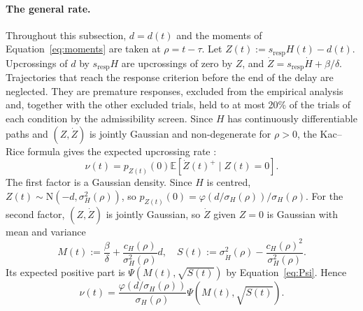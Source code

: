 \documentclass[a4paper,11pt]{article}
\theoremstyle{definition}
\newcommand{\E}{\mathbb E}
\newcommand{\1}{\mathbbm{1}}
\begin{document}
\paragraph{The general rate.} Throughout this subsection, $d=d(t)$ and the moments of Equation~\eqref{eq:moments} are taken at $\rho=t-\tau$. Let $Z\left(t\right):={s}_{\mathrm{resp}}H\left(t\right)-d\left(t\right)$. Upcrossings of $d$ by ${s}_{\mathrm{resp}}H$ are upcrossings of zero by $Z$, and $\dot{Z}={s}_{\mathrm{resp}}\dot{H}+\beta /\delta$. Trajectories that reach the response criterion before the end of the delay are neglected. They are premature responses, excluded from the empirical analysis and, together with the other excluded trials, held to at most 20\% of the trials of each condition by the admissibility screen. Since $H$ has continuously differentiable paths and $\left(Z,\dot{Z}\right)$ is jointly Gaussian and non-degenerate for $\rho >0$, the Kac--Rice formula gives the expected upcrossing rate \parencite[ch. 3]{azaisLevelSetsExtrema2009}:
\begin{equation}
\nu \left(t\right)={p}_{Z\left(t\right)}\left(0\right) \E\left[\dot{Z}\left(t\right)^{+} \mid Z\left(t\right)=0\right].
\label{eq:nu}
\end{equation}
The first factor is a Gaussian density. Since $H$ is centred, $Z\left(t\right)\sim \mathrm{N}\left(-d,{\sigma }_{H}^{2}\left(\rho \right)\right)$, so ${p}_{Z\left(t\right)}\left(0\right)=\varphi \left(d/{\sigma }_{H}\left(\rho \right)\right)/{\sigma }_{H}\left(\rho \right)$. For the second factor, $\left(Z,\dot{Z}\right)$ is jointly Gaussian, so $\dot{Z}$ given $Z=0$ is Gaussian with mean and variance
\begin{equation*}
M\left(t\right):=\frac{\beta }{\delta }+\frac{{c}_{H}\left(\rho \right)}{{\sigma }_{H}^{2}\left(\rho \right)}d, \quad S\left(t\right):={\sigma }_{\dot{H}}^{2}\left(\rho \right)-\frac{{c}_{H}{\left(\rho \right)}^{2}}{{\sigma }_{H}^{2}\left(\rho \right)}.
\end{equation*}
Its expected positive part is $\Psi\left(M(t),\sqrt{S(t)}\right)$ by Equation~\eqref{eq:Psi}. Hence
\begin{equation}
\nu \left(t\right)=\frac{\varphi \left(d/{\sigma }_{H}\left(\rho \right)\right)}{{\sigma }_{H}\left(\rho \right)}\Psi\left(M(t),\sqrt{S(t)}\right).
\label{eq:nu2}
\end{equation}
\end{document}
